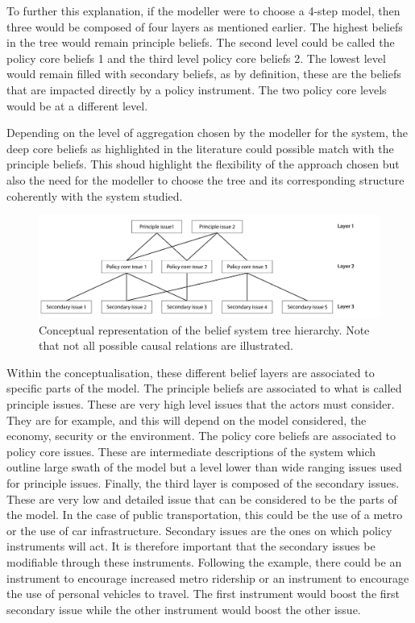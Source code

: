 To further this explanation, if the modeller were to choose a 4-step model, then three would be composed of four layers as mentioned earlier. The highest beliefs in the tree would remain principle beliefs. The second level could be called the policy core beliefs 1 and the third level policy core beliefs 2. The lowest level would remain filled with secondary beliefs, as by definition, these are the beliefs that are impacted directly by a policy instrument. The two policy core levels would be at a different level.

Depending on the level of aggregation chosen by the modeller for the system, the deep core beliefs as highlighted in the literature \cite{jenkins2014advocacy} could possible match with the principle beliefs. This shoud highlight the flexibility of the approach chosen but also the need for the modeller to choose the tree and its corresponding structure coherently with the system studied.
 
\begin{figure}
\centering
\includegraphics[scale = 0.33, angle = 0]{figures/BeliefTreeConceptualisation-01}
\caption{Conceptual representation of the belief system tree hierarchy. Note that not all possible causal relations are illustrated.}
\label{fig:BeliefTreeConceptualisation-01}
\end{figure}
 
Within the conceptualisation, these different belief layers are associated to specific parts of the model. The principle beliefs are associated to what is called principle issues. These are very high level issues that the actors must consider. They are for example, and this will depend on the model considered, the economy, security or the environment. The policy core beliefs are associated to policy core issues. These are intermediate descriptions of the system which outline large swath of the model but a level lower than wide ranging issues used for principle issues. Finally, the third layer is composed of the secondary issues. These are very low and detailed issue that can be considered to be the parts of the model. In the case of public transportation, this could be the use of a metro or the use of car infrastructure. Secondary issues are the ones on which policy instruments will act. It is therefore important that the secondary issues be modifiable through these instruments. Following the example, there could be an instrument to encourage increased metro ridership or an instrument to encourage the use of personal vehicles to travel. The first instrument would boost the first secondary issue while the other instrument would boost the other issue.
 
